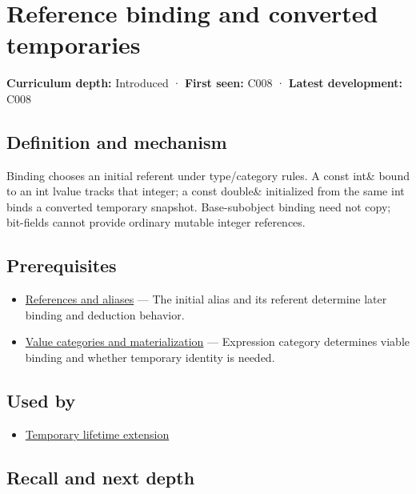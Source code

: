 \hypertarget{appendix-37856d997bb0}{}
\section{Reference binding and converted temporaries}\label{appendix-37856d997bb0-reference-binding-and-converted-temporaries}

\textbf{Curriculum depth:} Introduced · \textbf{First seen:} C008 · \textbf{Latest development:} C008

\subsection{Definition and mechanism}\label{appendix-37856d997bb0-definition-and-mechanism}

Binding chooses an initial referent under type/category rules. A const int\& bound to an int lvalue tracks that integer; a const double\& initialized from the same int binds a converted temporary snapshot. Base-subobject binding need not copy; bit-fields cannot provide ordinary mutable integer references.

\subsection{Prerequisites}\label{appendix-37856d997bb0-prerequisites}

\begin{itemize}
\tightlist
\item
  \hyperref[appendix-d6d562ca9fbb]{References and aliases} --- The initial alias and its referent determine later binding and deduction behavior.
\item
  \hyperref[appendix-1121b30eaeb0]{Value categories and materialization} --- Expression category determines viable binding and whether temporary identity is needed.
\end{itemize}

\subsection{Used by}\label{appendix-37856d997bb0-used-by}

\begin{itemize}
\tightlist
\item
  \hyperref[appendix-a978b29bbbb0]{Temporary lifetime extension}
\end{itemize}

\subsection{Recall and next depth}\label{appendix-37856d997bb0-recall-and-next-depth}


